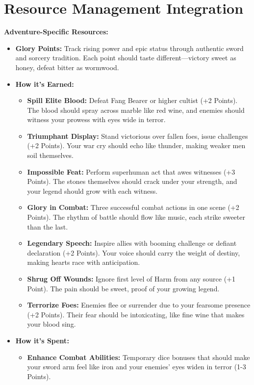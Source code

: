 \documentclass[11pt]{article}
\begin{document}
\section{Resource Management Integration}

\textbf{Adventure-Specific Resources:}
\begin{itemize}
\item \textbf{Glory Points:} Track rising power and epic status through authentic sword and sorcery tradition. Each point should taste different—victory sweet as honey, defeat bitter as wormwood.
\item \textbf{How it's Earned:}
  \begin{itemize}
  \item \textbf{Spill Elite Blood:} Defeat Fang Bearer or higher cultist (+2 Points). The blood should spray across marble like red wine, and enemies should witness your prowess with eyes wide in terror.
  \item \textbf{Triumphant Display:} Stand victorious over fallen foes, issue challenges (+2 Points). Your war cry should echo like thunder, making weaker men soil themselves.
  \item \textbf{Impossible Feat:} Perform superhuman act that awes witnesses (+3 Points). The stones themselves should crack under your strength, and your legend should grow with each witness.
  \item \textbf{Glory in Combat:} Three successful combat actions in one scene (+2 Points). The rhythm of battle should flow like music, each strike sweeter than the last.
  \item \textbf{Legendary Speech:} Inspire allies with booming challenge or defiant declaration (+2 Points). Your voice should carry the weight of destiny, making hearts race with anticipation.
  \item \textbf{Shrug Off Wounds:} Ignore first level of Harm from any source (+1 Point). The pain should be sweet, proof of your growing legend.
  \item \textbf{Terrorize Foes:} Enemies flee or surrender due to your fearsome presence (+2 Points). Their fear should be intoxicating, like fine wine that makes your blood sing.
  \end{itemize}
\item \textbf{How it's Spent:}
  \begin{itemize}
  \item \textbf{Enhance Combat Abilities:} Temporary dice bonuses that should make your sword arm feel like iron and your enemies' eyes widen in terror (1-3 Points).

\end{itemize}
\end{itemize}
\end{document}
